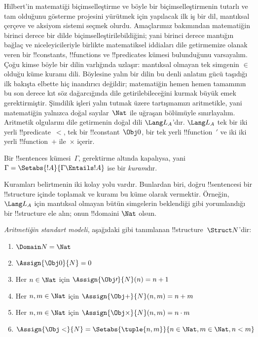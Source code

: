 



Hilbert'in matematiği biçimselleştirme ve böyle bir biçimselleştirmenin
tutarlı ve tam olduğunu gösterme projesini yürütmek için yapılacak ilk iş
bir dil, mantıksal çerçeve ve aksiyom sistemi seçmek olurdu. Amaçlarımız
bakımından matematiğin birinci derece bir dilde biçimselleştirilebildiğini;
yani birinci derece mantığın bağlaç ve niceleyicileriyle birlikte matematiksel
iddiaları dile getirmemize olanak veren bir !!{constant}s,
!!{function}s ve !!{predicate}s kümesi bulunduğunu varsayalım. Çoğu
kimse böyle bir dilin varlığında uzlaşır: mantıksal olmayan tek simgenin
$\in$ olduğu küme kuramı dili. Böylesine yalın bir dilin bu denli anlatım
gücü taşıdığı ilk bakışta elbette hiç inandırıcı değildir; matematiğin hemen
hemen tamamının bu son derece kıt söz dağarcığında dile getirilebileceğini
kurmak büyük emek gerektirmiştir. Şimdilik işleri yalın tutmak üzere
tartışmamızı aritmetikle, yani matematiğin yalnızca doğal sayılar~$\Nat$ ile
uğraşan bölümüyle sınırlayalım. Aritmetik olgularını dile getirmenin doğal
dili $\Lang L_A$'dır. $\Lang L_A$ tek bir iki yerli !!{predicate}~$<$,
tek bir !!{constant}~$\Obj 0$, bir tek yerli !!{function}~$\prime$ ve iki
iki yerli !!{function}~$+$ ile~$\times$ içerir.

\begin{defn}
Bir !!{sentence}s kümesi~$\Gamma$, gerektirme altında kapalıysa, yani
$\Gamma = \Setabs{!A}{\Gamma \Entails !A}$ ise bir \emph{kuram}dır.
\end{defn}

Kuramları belirtmenin iki kolay yolu vardır. Bunlardan biri, doğru
!!{sentence}s{}i bir !!{structure} içinde toplamak ve kuramı bu küme olarak
vermektir. Örneğin, $\Lang L_A$ için mantıksal olmayan bütün simgelerin
beklendiği gibi yorumlandığı bir !!{structure} ele alın; onun !!{domain}{}i
$\Nat$ olsun.

\begin{defn}
\emph{Aritmetiğin standart modeli}, aşağıdaki gibi tanımlanan
!!{structure}~$\Struct N$'dir:
\begin{enumerate}
\item $\Domain N = \Nat$
\item $\Assign{\Obj 0}{N} = 0$
\item Her $n \in \Nat$ için $\Assign{\Obj \prime}{N}(n) = n + 1$
\item Her $n, m \in \Nat$ için $\Assign{\Obj +}{N}(n, m) = n + m$
\item Her $n, m \in \Nat$ için $\Assign{\Obj \times}{N}(n, m) = n\cdot m$
\item $\Assign{\Obj <}{N} = \Setabs{\tuple{n, m}}{n \in \Nat, m \in
  \Nat, n < m}$
\end{enumerate}
\end{defn}

